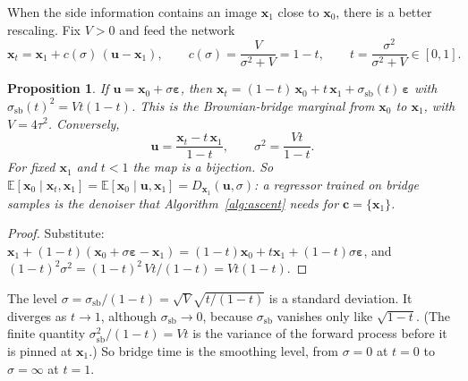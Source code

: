 \documentclass[11pt]{article}
\newtheorem{proposition}{Proposition}
\theoremstyle{remark}
\newcommand{\x}{\bm{x}}
\newcommand{\uu}{\bm{u}}
\newcommand{\eps}{\bm{\varepsilon}}
\newcommand{\cc}{\bm{c}}
\newcommand{\E}{\mathbb{E}}
\newcommand{\ssb}{\sigma_{\mathrm{sb}}}
\newcommand{\Dg}{D_{\x_1}}
\begin{document}
When the side information contains an image $\x_1$ close to $\x_0$, there is a better rescaling.
Fix $V>0$ and feed the network
\begin{equation}
  \x_t = \x_1 + c(\sigma)\,(\uu-\x_1),\qquad c(\sigma) = \frac{V}{\sigma^2+V} = 1-t,
  \qquad t = \frac{\sigma^2}{\sigma^2+V}\in[0,1].
  \label{eq:x}
\end{equation}

\begin{proposition}\label{prop:bridge}
If $\uu=\x_0+\sigma\eps$, then $\x_t = (1-t)\,\x_0 + t\,\x_1 + \ssb(t)\,\eps$ with
$\ssb(t)^2 = Vt(1-t)$. This is the Brownian-bridge marginal from $\x_0$ to $\x_1$, with
$V=4\tau^2$. Conversely,
\begin{equation}
  \uu = \frac{\x_t - t\,\x_1}{1-t},\qquad \sigma^2 = \frac{Vt}{1-t}.
  \label{eq:u}
\end{equation}
For fixed $\x_1$ and $t<1$ the map is a bijection. So $\E[\x_0\mid\x_t,\x_1] =
\E[\x_0\mid\uu,\x_1] = \Dg(\uu,\sigma)$: a regressor trained on bridge samples \emph{is} the
denoiser that Algorithm~\ref{alg:ascent} needs for $\cc=\{\x_1\}$.
\end{proposition}
\begin{proof}
Substitute: $\x_1 + (1-t)(\x_0+\sigma\eps-\x_1) = (1-t)\x_0 + t\x_1 + (1-t)\sigma\eps$, and
$(1-t)^2\sigma^2 = (1-t)^2\,Vt/(1-t) = Vt(1-t)$.
\end{proof}

The level $\sigma = \ssb/(1-t) = \sqrt V\sqrt{t/(1-t)}$ is a standard deviation. It diverges as
$t\to1$, although $\ssb\to0$, because $\ssb$ vanishes only like $\sqrt{1-t}$. (The finite
quantity $\ssb^2/(1-t)=Vt$ is the variance of the forward process before it is pinned at
$\x_1$.) So bridge time is the smoothing level, from $\sigma=0$ at $t=0$ to $\sigma=\infty$ at
$t=1$.
\end{document}
